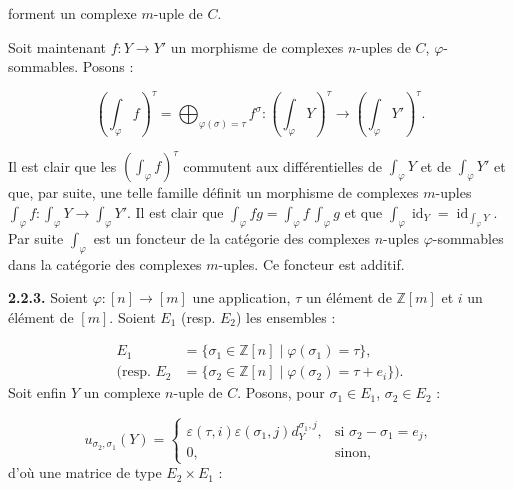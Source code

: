 %
%
forment un complexe $m$-uple de $C$.

Soit maintenant $f\colon Y\longrightarrow Y'$ un morphisme de complexes
$n$-uples de $C$, $\varphi$-sommables. Posons :

\begin{equation}
  \left(\int_\varphi f\right)^\tau
  =\bigoplus_{\varphi(\sigma)=\tau}f^\sigma\colon
  \left(\int_\varphi Y\right)^\tau
  \longrightarrow
  \left(\int_\varphi Y'\right)^\tau.
  \tag{2.2.2.6}
\end{equation}

Il est clair que les $\left(\int_\varphi f\right)^\tau$ commutent aux
différentielles de $\int_\varphi Y$ et de $\int_\varphi Y'$ et que, par
suite, une telle famille définit un morphisme de complexes $m$-uples
$\int_\varphi f\colon\int_\varphi Y\longrightarrow\int_\varphi Y'$.
Il est clair que
$\int_\varphi fg=\int_\varphi f\,\int_\varphi g$ et que
$\int_\varphi\operatorname{id}_Y
=\operatorname{id}_{\int_\varphi Y}$. Par suite $\int_\varphi$ est un
foncteur de la catégorie des complexes $n$-uples $\varphi$-sommables dans
la catégorie des complexes $m$-uples. Ce foncteur est additif.

\noindent\textbf{2.2.3.}\quad
Soient $\varphi\colon[n]\longrightarrow[m]$ une application, $\tau$ un
élément de $\mathbb Z[m]$ et $i$ un élément de $[m]$. Soient $E_1$
(resp. $E_2$) les ensembles :

\[
  \begin{aligned}
    E_1&=\{\sigma_1\in\mathbb Z[n]\mid\varphi(\sigma_1)=\tau\},\\
    \text{(resp. }E_2
      &=\{\sigma_2\in\mathbb Z[n]\mid
          \varphi(\sigma_2)=\tau+e_i\}\text{)}.
  \end{aligned}
\]
Soit enfin $Y$ un complexe $n$-uple de $C$. Posons, pour
$\sigma_1\in E_1$, $\sigma_2\in E_2$ :

\begin{equation}
  u_{\sigma_2,\sigma_1}(Y)
  =\begin{cases}
    \varepsilon(\tau,i)\varepsilon(\sigma_1,j)d_Y^{\sigma_1,j},
      &\text{si }\sigma_2-\sigma_1=e_j,\\
    0,&\text{sinon},
  \end{cases}
  \tag{2.2.3.1}
\end{equation}
d'où une matrice de type $E_2\times E_1$ :

